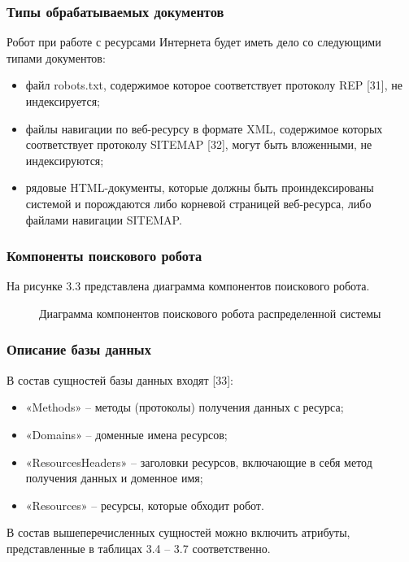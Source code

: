 \subsubsection{Типы обрабатываемых документов}
Робот при работе с ресурсами Интернета будет иметь дело со следующими типами документов:
\begin{itemize}
\item файл robots.txt, содержимое которое соответствует протоколу REP [31], не индексируется;
\item файлы навигации по веб-ресурсу в формате XML, содержимое которых соответствует протоколу SITEMAP [32], могут быть вложенными, не индексируются;
\item рядовые HTML-документы, которые должны быть проиндексированы системой и порождаются либо корневой страницей веб-ресурса, либо файлами навигации SITEMAP.
\end{itemize}

\subsubsection{Компоненты поискового робота}

На рисунке 3.3 представлена диаграмма компонентов поискового робота.

\begin{figure}[H]
\caption{Диаграмма компонентов поискового робота распределенной системы}
\label{robot/diagram_components:image}
\end{figure}

\subsubsection{Описание базы данных}

В состав сущностей базы данных входят [33]:
\begin{itemize}
\item «Methods» -- методы (протоколы) получения данных с ресурса;
\item «Domains» -- доменные имена ресурсов;
\item «ResourcesHeaders» -- заголовки ресурсов, включающие в себя метод получения данных и доменное имя;
\item «Resources» -- ресурсы, которые обходит робот.
\end{itemize}

В состав вышеперечисленных сущностей можно включить атрибуты, представленные в таблицах 3.4 – 3.7 соответственно.

